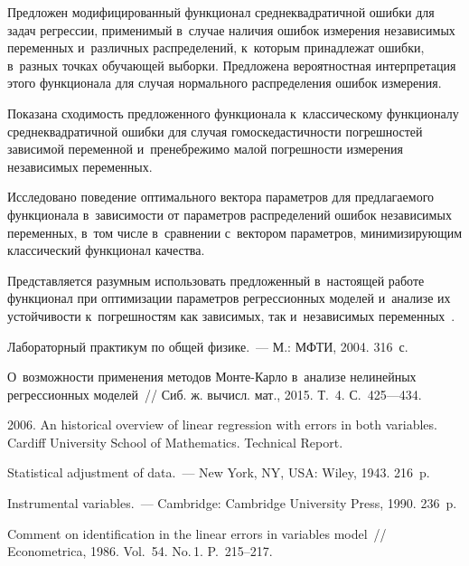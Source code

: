 \begin{multicols}{2}
Предложен модифицированный функционал среднеквадратичной ошибки для задач
регрессии, применимый в~случае наличия ошибок измерения независимых
переменных и~различных распределений, к~которым принадлежат ошибки, в~разных
точках обучающей выборки. Предложена вероятностная интерпретация этого
функционала для случая нормального распределения ошибок измерения.

Показана сходимость предложенного функционала к~классическому функционалу
сред\-не\-квад\-ра\-тич\-ной ошибки для случая гомоскедастичности погрешностей
зависимой переменной и~пренебрежимо малой погрешности измерения независимых
переменных.

Исследовано поведение оптимального вектора параметров для предлагаемого
функционала в~зависимости от параметров распределений ошибок независимых
переменных, в~том числе в~сравнении с~вектором параметров, минимизирующим
классический функционал качества.

Представляется разумным использовать предложенный в~настоящей работе функционал
при оптимизации параметров регрессионных моделей и~анализе их
устойчивости к~погрешностям как зависимых, так и~независимых
переменных~\cite{Rudoy15MonteCarlo,Rudoy16StabilityAnalysis}.


{\small\frenchspacing
 {%
 \begin{thebibliography}{99}
Лабораторный практикум по общей физике.~---
М.: МФТИ, 2004. 316~с.

  О~возможности применения методов Мон\-те-Кар\-ло в~анализе
нелинейных регрессионных моделей~//
Сиб. ж. вычисл. мат., 2015. Т.~4. С.~425---434.

 2006.  
An historical overview of linear regression with errors in both variables.
Cardiff University School of Mathematics. Technical Report.

  {Statistical adjustment of data.}~---
New York, NY, USA: Wiley, 1943.  216~p.

{Instrumental variables}.~---
Cambridge: Cambridge University Press, 1990. 236~p.

  Comment on
  identification in the linear errors in variables model~//
{Econometrica}, 1986. Vol.~54. No.\,1. P.~215--217.


\end{thebibliography}}}
\end{multicols}
